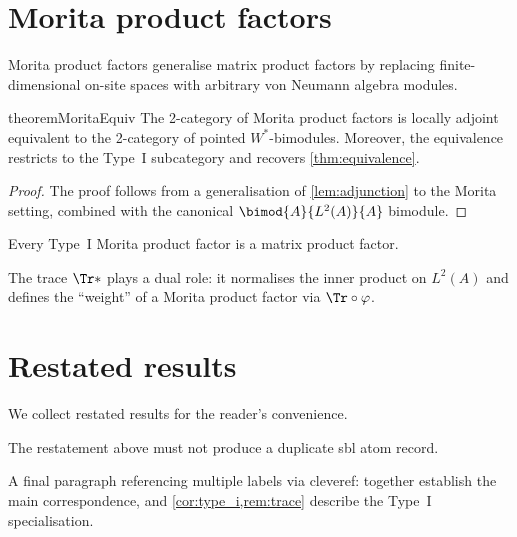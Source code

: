 \documentclass{article}
\numberwithin{equation}{section}
\begin{document}
\section{Morita product factors}%
\label{sec:morita}

Morita product factors generalise matrix product factors by replacing
finite-dimensional on-site spaces with arbitrary von Neumann algebra
modules.

\begin{restatable}{theorem}{MoritaEquiv}\label{thm:morita_equiv}
  The 2-category of Morita product factors is locally adjoint
  equivalent to the 2-category of pointed $W^*$-bimodules.
  Moreover, the equivalence restricts to the Type~I subcategory
  and recovers \cref{thm:equivalence}.
\end{restatable}

\begin{proof}
  The proof follows from a generalisation of \cref{lem:adjunction}
  to the Morita setting, combined with the canonical
  $\bimod{A}{L^2(A)}{A}$ bimodule.
\end{proof}

\begin{corollary}\label{cor:type_i}
  Every Type~I Morita product factor is a matrix product factor.
\end{corollary}

\begin{remark}\label{rem:trace}
  The trace $\Tr*$ plays a dual role: it normalises the inner product
  on $L^2(A)$ and defines the ``weight'' of a Morita product factor
  via $\Tr \circ \varphi$.
\end{remark}

\section{Restated results}%
\label{sec:restate}

We collect restated results for the reader's convenience.

\MoritaEquiv*

The restatement above must not produce a duplicate sbl atom record.

A final paragraph referencing multiple labels via cleveref:
 together
establish the main correspondence, and
\cref{cor:type_i,rem:trace} describe the Type~I specialisation.

\END
\end{document}
